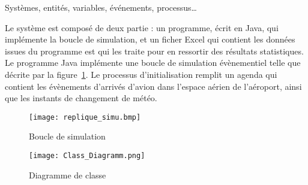 Systèmes, entités, variables, événements, processus… 

Le système est composé de deux partie : un programme, écrit en Java,  qui implémente la boucle de simulation, et un ficher Excel qui contient les données issues du programme est qui les traite pour en ressortir des résultats statistiques.
\\
Le programme Java implémente une boucle de simulation évènementiel telle que décrite par la figure~\ref{replique}. 
Le processus d'initialisation remplit un agenda qui contient les évènements d'arrivés d'avion dans l'espace aérien de l'aéroport, ainsi que les instants de changement de météo.



 \begin{figure}[h]
   \caption{\label{replique} Boucle de simulation}
 \texttt{[image: replique\_simu.bmp]}
 \end{figure}






\begin{figure}[h]
   \caption{\label{class_diagramm} Diagramme de classe}
 \texttt{[image: Class\_Diagramm.png]}
 \end{figure}
 
